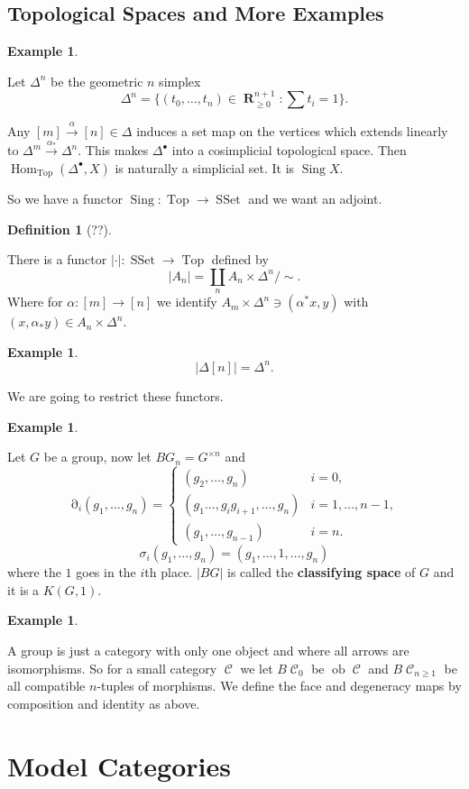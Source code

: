 \documentclass[10pt,]{book}
\newcommand{\terminology}[1]{\textbf{#1}}
\theoremstyle{plain}
\theoremstyle{definition}
\newtheorem{definition}[theorem]{Definition}
\newtheorem{example}[theorem]{Example}
\numberwithin{equation}{section}
\DeclareMathOperator{\Hom}{Hom}
\DeclareMathOperator{\ob}{ob}
\DeclareMathOperator{\Sing}{Sing}
\DeclareMathOperator{\Top}{\text{Top}}
\DeclareMathOperator{\SSet}{\text{SSet}}
\DeclareMathOperator{\cC}{\mathcal{C}}
\DeclareMathOperator{\dd}{\partial}
\DeclareMathOperator{\RR}{\mathbf{R}}
\begin{document}
\section[Topological Spaces and More Examples]{Topological Spaces and More Examples}\label{sec-top-examples}
\begin{example}\label{example-19}

            Let \(\Delta^n\) be the geometric \(n\) simplex
            \[\Delta^n = \{(t_0,\ldots,t_n) \in \RR_{\ge 0}^{n+1} : \sum t_i = 1\}.\]

            Any \([m]\xrightarrow{\alpha} [n] \in \Delta\) induces a set map on the vertices which extends linearly to \(\Delta^m \xrightarrow{\alpha_*} \Delta^n\).
            This makes \(\Delta^{\bullet}\) into a cosimplicial topological space.
            Then \(\Hom_{\Top}(\Delta^{\bullet}, X)\) is naturally a simplicial set.
            It is \(\Sing X\).

            So we have a functor \(\Sing \colon \Top \to \SSet\) and we want an adjoint.
          \end{example}
\begin{definition}[??]\label{definition-28}

            There is a functor \(|\cdot |\colon \SSet \to \Top\) defined by
            \[
              |A_n| = \coprod_n A_n \times \Delta^n / \sim.
            \]
            Where for \(\alpha \colon [m] \to [n]\) we identify \(A_m \times \Delta^n \ni (\alpha^* x, y)\) with \((x, \alpha_* y) \in A_n \times \Delta^n\).
          \end{definition}
\begin{example}\label{example-20}
\[|\Delta[n]| = \Delta^n.\]\end{example}

          We are going to restrict these functors.
\begin{example}\label{example-21}

            Let \(G\) be a group, now let \(BG_n = G^{\times n}\) and
            \[\dd_i(g_1,\ldots,g_n) = \begin{cases}(g_2,\ldots,g_n) & i = 0, \\(g_1\ldots,g_ig_{i+1},\ldots,g_n) & i = 1,\ldots,n-1,\\(g_1,\ldots,g_{n-1}) & i = n.\end{cases}\]\[\sigma_i(g_1,\ldots,g_n) = (g_1,\ldots,1,\ldots,g_n)\]
            where the \(1\) goes in the \(i\)th place.
            \(|BG|\) is called the \terminology{classifying space} of \(G\) and it is a \(K(G,1)\).
          \end{example}
\begin{example}\label{example-22}

            A group is just a category with only one object and where all arrows are isomorphisms.
            So for a small category \(\cC\) we let \(B\cC_0\) be \(\ob \cC\) and \(B\cC_{n\ge 1}\) be all compatible \(n\)-tuples of morphisms.
            We define the face and degeneracy maps by composition and identity as above.
          \end{example}
\typeout{************************************************}
\typeout{************************************************}
\chapter[Model Categories]{Model Categories}\label{chap-model-cats}
%
\backmatter
%
\end{document}
